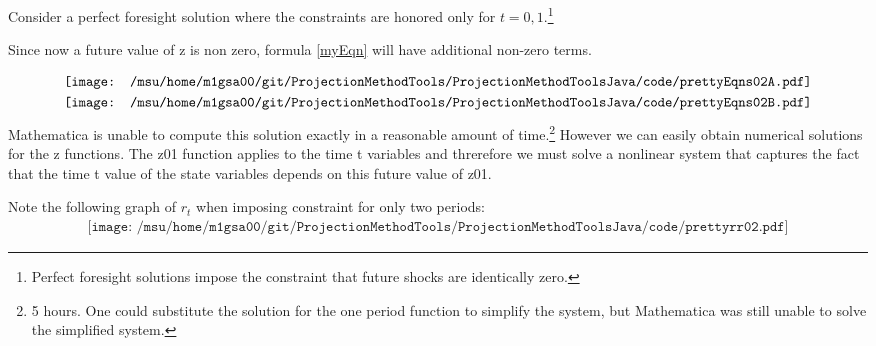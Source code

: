 
Consider a perfect foresight solution where the constraints are honored only 
for $t=0,1$.\footnote{ Perfect foresight solutions impose the constraint that future shocks are identically zero.}

Since now a future value of z is non zero, formula \ref{myEqn}  will have additional non-zero terms.


\begin{gather*}
  \vcenter{\hbox{\texttt{[image: /msu/home/m1gsa00/git/ProjectionMethodTools/ProjectionMethodToolsJava/code/prettyEqns02A.pdf]}}}\\
  \vcenter{\hbox{\texttt{[image: /msu/home/m1gsa00/git/ProjectionMethodTools/ProjectionMethodToolsJava/code/prettyEqns02B.pdf]}}}\\
\end{gather*}
Mathematica is unable to compute this solution exactly in a reasonable amount
of time.\footnote{ 5 hours.  One could substitute the solution for the one period function to simplify the system, but Mathematica was still unable to solve the simplified system.}  However we can easily obtain numerical solutions for the z functions.  The z01 function applies to the time t variables and 
threrefore we must solve a nonlinear system that captures the fact that
the time t value of the state variables depends on this future value of z01.


Note the following graph of $r_t$ when imposing constraint for only two periods:
\begin{gather*}
\texttt{[image: /msu/home/m1gsa00/git/ProjectionMethodTools/ProjectionMethodToolsJava/code/prettyrr02.pdf]}
\end{gather*}



\newcommand{\lucaXt}{
   \begin{bmatrix}
    q_{t-1}\\r_{ut-1}\\r_{t-1}\\
     q_{t}\\r_{ut}\\r_{t}\\
     q_{t+1}\\r_{ut+1}\\r_{t+1}
   \end{bmatrix}}

 \newcommand{\lucaXtpOne}{
   \begin{bmatrix}
     q_{t}\\r_{ut}\\r_{t}\\
     q_{t+1}\\r_{ut+1}\\r_{t+1}\\
     q_{t+2}\\r_{ut+2}\\r_{t+2}
   \end{bmatrix}}


